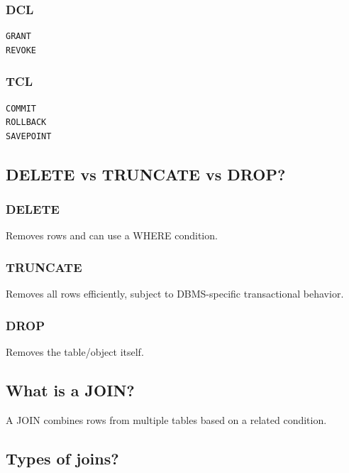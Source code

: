 \subsubsection{DCL}

\begin{lstlisting}
GRANT
REVOKE
\end{lstlisting}

\subsubsection{TCL}

\begin{lstlisting}
COMMIT
ROLLBACK
SAVEPOINT
\end{lstlisting}

\medskip

\subsection{DELETE vs TRUNCATE vs DROP?}

\subsubsection{DELETE}

Removes rows and can use a WHERE condition.

\subsubsection{TRUNCATE}

Removes all rows efficiently, subject to DBMS-specific transactional behavior.

\subsubsection{DROP}

Removes the table/object itself.

\medskip

\subsection{What is a JOIN?}

A JOIN combines rows from multiple tables based on a related condition.

\medskip

\subsection{Types of joins?}

